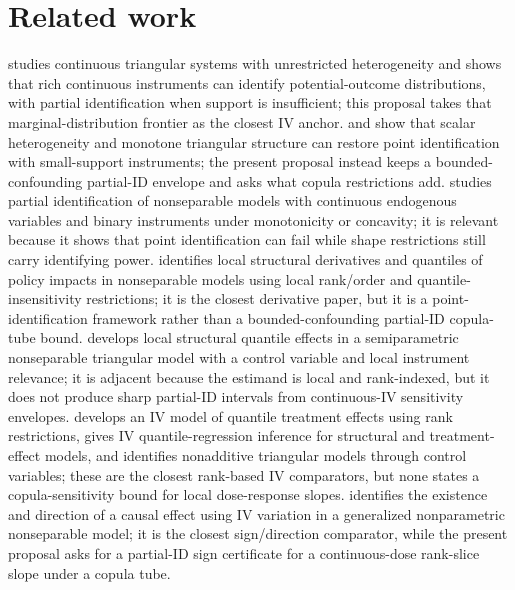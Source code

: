 \documentclass[11pt]{article}
\theoremstyle{definition}
\theoremstyle{plain}
\theoremstyle{remark}
\begin{document}
\section{Related work}
\citet{Kasy2014} studies continuous triangular systems with unrestricted heterogeneity and shows that rich continuous instruments can identify potential-outcome distributions, with partial identification when support is insufficient; this proposal takes that marginal-distribution frontier as the closest IV anchor.  \citet{Torgovitsky2015} and \citet{DHaultfoeuilleFevrier2015} show that scalar heterogeneity and monotone triangular structure can restore point identification with small-support instruments; the present proposal instead keeps a bounded-confounding partial-ID envelope and asks what copula restrictions add.  \citet{Ishihara2021} studies partial identification of nonseparable models with continuous endogenous variables and binary instruments under monotonicity or concavity; it is relevant because it shows that point identification can fail while shape restrictions still carry identifying power.  \citet{Chesher2003} identifies local structural derivatives and quantiles of policy impacts in nonseparable models using local rank/order and quantile-insensitivity restrictions; it is the closest derivative paper, but it is a point-identification framework rather than a bounded-confounding partial-ID copula-tube bound.  \citet{Jun2009} develops local structural quantile effects in a semiparametric nonseparable triangular model with a control variable and local instrument relevance; it is adjacent because the estimand is local and rank-indexed, but it does not produce sharp partial-ID intervals from continuous-IV sensitivity envelopes.  \citet{ChernozhukovHansen2005} develops an IV model of quantile treatment effects using rank restrictions, \citet{ChernozhukovHansen2006} gives IV quantile-regression inference for structural and treatment-effect models, and \citet{ImbensNewey2009} identifies nonadditive triangular models through control variables; these are the closest rank-based IV comparators, but none states a copula-sensitivity bound for local dose-response slopes.  \citet{Kline2016} identifies the existence and direction of a causal effect using IV variation in a generalized nonparametric nonseparable model; it is the closest sign/direction comparator, while the present proposal asks for a partial-ID sign certificate for a continuous-dose rank-slice slope under a copula tube.
\end{document}
